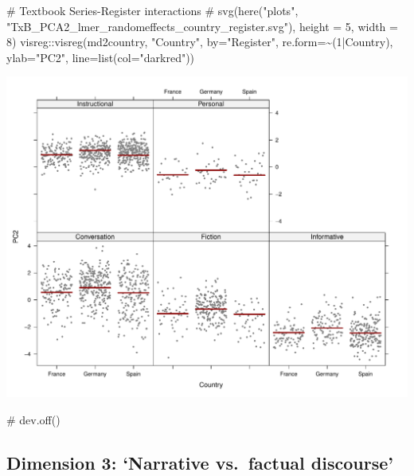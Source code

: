 \documentclass[
  letterpaper,
  DIV=11,
  numbers=noendperiod]{scrreprt}
\newenvironment{Shaded}{\begin{snugshade}}{\end{snugshade}}
\newcommand{\AttributeTok}[1]{\textcolor[rgb]{0.40,0.45,0.13}{#1}}
\newcommand{\CommentTok}[1]{\textcolor[rgb]{0.37,0.37,0.37}{#1}}
\newcommand{\DecValTok}[1]{\textcolor[rgb]{0.68,0.00,0.00}{#1}}
\newcommand{\FunctionTok}[1]{\textcolor[rgb]{0.28,0.35,0.67}{#1}}
\newcommand{\NormalTok}[1]{\textcolor[rgb]{0.00,0.23,0.31}{#1}}
\newcommand{\SpecialCharTok}[1]{\textcolor[rgb]{0.37,0.37,0.37}{#1}}
\newcommand{\StringTok}[1]{\textcolor[rgb]{0.13,0.47,0.30}{#1}}
\begin{document}
\begin{Shaded}
\begin{Highlighting}[]
\CommentTok{\# Textbook Series{-}Register interactions}
\CommentTok{\# svg(here("plots", "TxB\_PCA2\_lmer\_randomeffects\_country\_register.svg"), height = 5, width = 8)}
\NormalTok{visreg}\SpecialCharTok{::}\FunctionTok{visreg}\NormalTok{(md2country, }\StringTok{"Country"}\NormalTok{, }\AttributeTok{by=}\StringTok{"Register"}\NormalTok{, }\AttributeTok{re.form=}\SpecialCharTok{\textasciitilde{}}\NormalTok{(}\DecValTok{1}\SpecialCharTok{|}\NormalTok{Country),}
               \AttributeTok{ylab=}\StringTok{"PC2"}\NormalTok{, }\AttributeTok{line=}\FunctionTok{list}\NormalTok{(}\AttributeTok{col=}\StringTok{"darkred"}\NormalTok{))}
\end{Highlighting}
\end{Shaded}

\includegraphics{AppendixF_files/figure-pdf/Dim2estimateplots-4.pdf}

\begin{Shaded}
\begin{Highlighting}[]
\CommentTok{\# dev.off()}
\end{Highlighting}
\end{Shaded}

\subsection{Dimension 3: `Narrative vs.~factual
discourse'}\label{dimension-3-narrative-vs.-factual-discourse}
\end{document}
